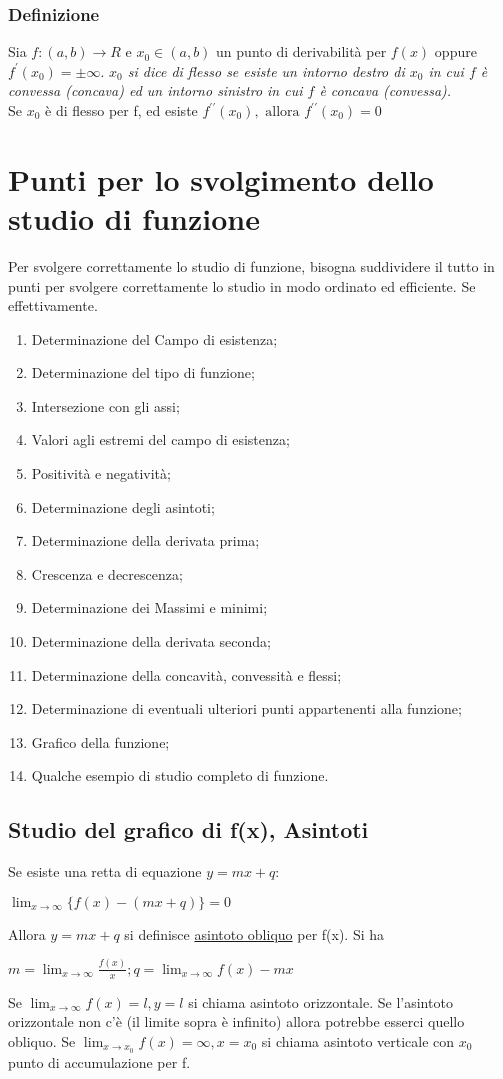 \subsubsection{Definizione}
Sia $f:(a,b)\to R$ e $x_0\in (a,b)$ un punto di derivabilità per $f(x)$ oppure
$f^\prime(x_0)=\pm\infty$. \textit{$x_0$ si dice di flesso se esiste un intorno
destro di $x_0$ in cui $f$ è convessa (concava) ed un intorno sinistro in cui
$f$ è concava (convessa).}\\
Se $x_0$ è di flesso per f, ed esiste $f^{\prime\prime} (x_0),\text{ allora }
f^{\prime\prime}(x_0)=0$

\section{Punti per lo svolgimento dello studio di funzione}
Per svolgere correttamente lo studio di funzione, bisogna suddividere il tutto
in punti per svolgere correttamente lo studio in modo ordinato ed efficiente.
Se effettivamente.
\begin{enumerate}
	\item Determinazione del Campo di esistenza;
	\item Determinazione del tipo di funzione;
	\item Intersezione con gli assi;
	\item Valori agli estremi del campo di esistenza;
	\item Positività e negatività;
	\item Determinazione degli asintoti;
	\item Determinazione della derivata prima;
	\item Crescenza e decrescenza;
	\item Determinazione dei Massimi e minimi;
	\item Determinazione della derivata seconda;
	\item Determinazione della concavità, convessità e flessi;
	\item Determinazione di eventuali ulteriori punti appartenenti alla
		funzione;
	\item Grafico della funzione;
	\item Qualche esempio di studio completo di funzione.
\end{enumerate}
\subsection{Studio del grafico di f(x), Asintoti}
Se esiste una retta di equazione $y=mx+q$:
\begin{center}
	$\lim_{x\to\infty}\{f(x)- (mx+q)\}=0$
\end{center}
Allora $y=mx+q$ si definisce \underline{\color{red}asintoto obliquo} per f(x).
Si ha 
\begin{center}
	$m=\lim_{x\to \infty}\frac{f(x)}{x}; q=\lim_{x\to \infty} f(x)-mx$
\end{center}
Se $\lim_{x\to \infty}f(x)=l, y=l$ si chiama asintoto orizzontale.
Se l'asintoto orizzontale non c'è (il limite sopra è infinito) allora potrebbe
esserci quello obliquo. Se $\lim_{x\to x_0}f(x)=\infty, x=x_0$ si chiama
asintoto verticale con $x_0$ punto di accumulazione per f.
